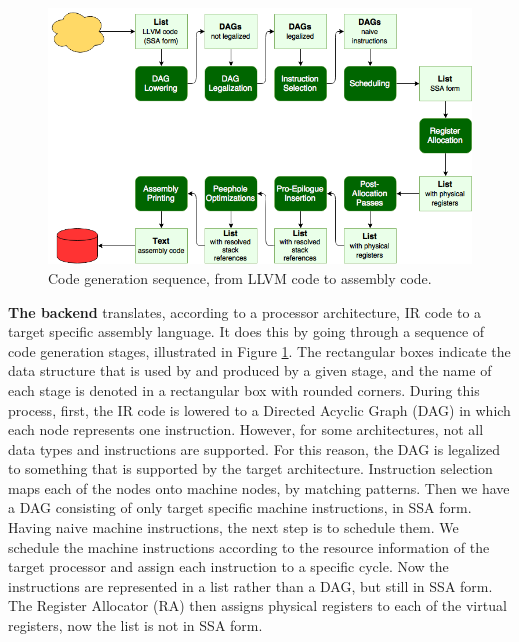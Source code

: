 \begin{figure}[b!]
\centering
\includegraphics[width=\textwidth]{figures/code_generation_sequence}
\caption{Code generation sequence, from LLVM code to assembly code.}
\label{fig:code_generation}
\end{figure}

\textbf{The backend} translates, according to a processor architecture, IR code to a target specific assembly language. It does this by going through a sequence of code generation stages, illustrated in Figure \ref{fig:code_generation}. The rectangular boxes indicate the data structure that is used by and produced by a given stage, and the name of each stage is denoted in a rectangular box with rounded corners. During this process, first, the IR code is lowered to a Directed Acyclic Graph (DAG) in which each node represents one instruction. However, for some architectures, not all data types and instructions are supported. For this reason, the DAG is legalized to something that is supported by the target architecture. Instruction selection maps each of the nodes onto machine nodes, by matching patterns. %
Then we have a DAG consisting of only target specific machine instructions, in SSA form. Having naive machine instructions, the next step is to schedule them. We schedule the machine instructions according to the resource information of the target processor and assign each instruction to a specific cycle. 
Now the instructions are represented in a list rather than a DAG, but still in SSA form. The Register Allocator (RA) then assigns physical registers to each of the virtual registers, now the list is not in SSA form. 

